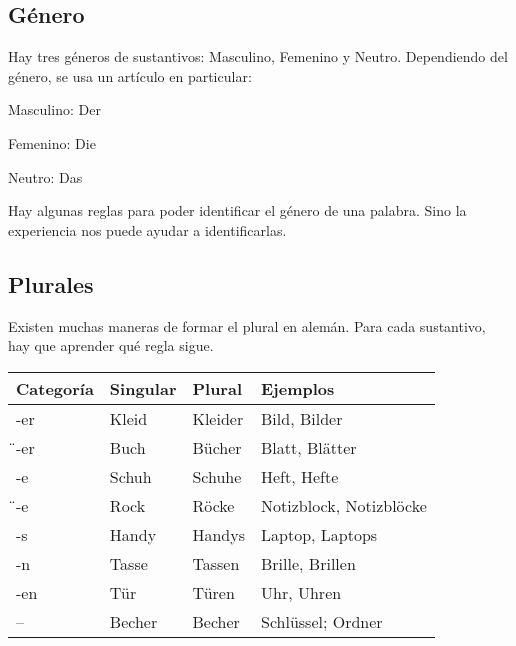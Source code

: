 \subsection{Género}
Hay tres géneros de sustantivos: Masculino, Femenino y Neutro. Dependiendo del género, se usa un artículo en particular:
\begin{myitemize}
\item Masculino: Der
\item Femenino: Die
\item Neutro: Das
\end{myitemize}
Hay algunas reglas para poder identificar el género de una palabra. Sino la experiencia nos puede ayudar a identificarlas.

\subsection{Plurales}
Existen muchas maneras de formar el plural en alemán. Para cada sustantivo, hay que aprender qué regla sigue.

\begin{tabular}{|l | l l l|}
\hline
\textbf{Categoría} & Singular & Plural & Ejemplos\\
\hline
-er & Kleid & Kleider & Bild, Bilder \\
\"{ }-er & Buch & Bücher & Blatt, Blätter \\
-e & Schuh & Schuhe & Heft, Hefte \\
\"{ }-e & Rock & Röcke & Notizblock, Notizblöcke \\
-s & Handy & Handys & Laptop, Laptops \\
-n & Tasse & Tassen & Brille, Brillen \\
-en & Tür & Türen & Uhr, Uhren \\
-- & Becher & Becher & Schlüssel; Ordner \\
\hline
\end{tabular}

